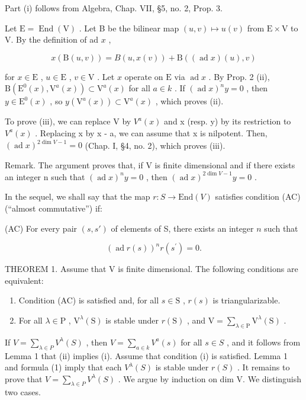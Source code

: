 Part (i) follows from Algebra, Chap. VII, §5, no. 2, Prop. 3.

Let \(\mathrm{E} = \operatorname{End}(\mathrm{V})\) . Let B be the bilinear map \((u, v) \mapsto u(v)\) from \(\mathrm{E} \times \mathrm{V}\) to V. By the definition of ad \(x\) ,

\[
x (\mathrm{B} (u, v)) = B (u, x (v)) + \mathrm{B} ((\operatorname{ad} x) (u), v)
\]

for \(x \in \mathrm{E}\) , \(u \in \mathrm{E}\) , \(v \in \mathrm{V}\) . Let \(x\) operate on \(\mathrm{E}\) via \(\operatorname{ad} x\) . By Prop. 2 (ii), \(\mathrm{B}(\mathrm{E}^0(x), \mathrm{V}^a(x)) \subset \mathrm{V}^a(x)\) for all \(a \in k\) . If \((\operatorname{ad} x)^n y = 0\) , then \(y \in \mathrm{E}^0(x)\) , so \(y(\mathrm{V}^a(x)) \subset \mathrm{V}^a(x)\) , which proves (ii).

To prove (iii), we can replace V by \(V^{a}(x)\) and x (resp. y) by its restriction to \(V^{a}(x)\) . Replacing x by x - a, we can assume that x is nilpotent. Then, \((\operatorname{ad} x)^{2\dim V-1} = 0\) (Chap. I, §4, no. 2), which proves (iii).

Remark. The argument proves that, if V is finite dimensional and if there exists an integer n such that \((\operatorname{ad} x)^{n}y = 0\) , then \((\operatorname{ad} x)^{2\dim V-1}y = 0\) .

In the sequel, we shall say that the map \(r : S \to \text{End}(V)\) satisfies condition (AC) (``almost commutative'') if:

(AC) For every pair \((s, s')\) of elements of S, there exists an integer \(n\) such that

\[
(\operatorname{ad} r (s)) ^ {n} r \left(s ^ {\prime}\right) = 0.
\]

THEOREM 1. Assume that V is finite dimensional. The following conditions are equivalent:

\begin{enumerate}
\def\labelenumi{(\roman{enumi})}
\item
  Condition (AC) is satisfied and, for all \(s \in \mathrm{S}\) , \(r(s)\) is triangularizable.
\item
  For all \(\lambda \in \mathrm{P}\) , \(\mathrm{V}^{\lambda}(\mathrm{S})\) is stable under \(r(\mathrm{S})\) , and \(\mathrm{V} = \sum_{\lambda \in \mathrm{P}} \mathrm{V}^{\lambda}(\mathrm{S})\) .
\end{enumerate}

If \(V = \sum_{\lambda \in P} V^{\lambda}(S)\) , then \(V = \sum_{a \in k} V^{a}(s)\) for all \(s \in S\) , and it follows from Lemma 1 that (ii) implies (i). Assume that condition (i) is satisfied. Lemma 1 and formula (1) imply that each \(V^{\lambda}(S)\) is stable under \(r(S)\) . It remains to prove that \(V = \sum_{\lambda \in P} V^{\lambda}(S)\) . We argue by induction on dim V. We distinguish two cases.

